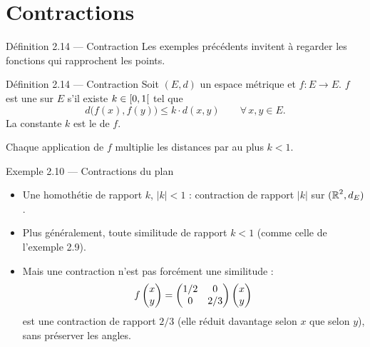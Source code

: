 \section{Contractions}

\begin{frame}{Définition 2.14 --- Contraction}
  \small Les exemples précédents invitent à regarder les fonctions qui
  rapprochent les points.
  \begin{Enonce}{Définition 2.14 --- Contraction}
    Soit $(E,d)$ un espace métrique et $f:E\to E$. $f$ est une
     sur $E$ s'il existe $k\in\mathopen{[}{0},{1}\mathclose{[}$ tel que
    \[
      d\big(f(x),f(y)\big)\leq k\cdot d(x,y)\qquad\forall\,x,y\in E.
    \]
    La constante $k$ est le  de $f$.
  \end{Enonce}
  \small Chaque application de $f$ multiplie les distances par au plus
  $k<1$.
\end{frame}

\begin{frame}{Exemple 2.10 --- Contractions du plan}
  \small
  \begin{itemize}
    \item Une homothétie de rapport $k$, $|k|<1$ : contraction de
      rapport $|k|$ sur $(\operatorname{\mathbb{R}}^2,d_E)$.
    \item Plus généralement, toute similitude de rapport $k<1$ (comme
      celle de l'exemple 2.9).
    \item Mais une contraction n'est pas forcément une
      similitude :
      \[
        f\begin{pmatrix}x\\ y\end{pmatrix} = \begin{pmatrix}1/2 & 0\\ 0 & 2/3\end{pmatrix}\begin{pmatrix}x\\ y\end{pmatrix}
      \]
      est une contraction de rapport $2/3$ (elle réduit davantage
      selon $x$ que selon $y$), sans préserver les angles.
  \end{itemize}
\end{frame}


